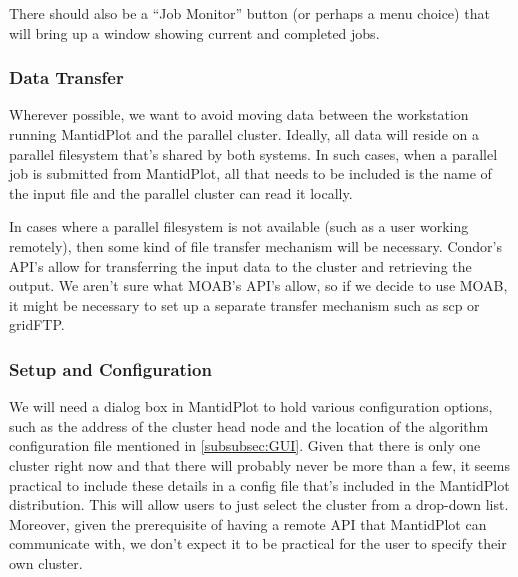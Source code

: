 There should also be a ``Job Monitor'' button (or perhaps a menu choice) that will bring up a window showing current and completed jobs.

\subsubsection{Data Transfer}
Wherever possible, we want to avoid moving data between the workstation running MantidPlot and the parallel cluster.  Ideally, all data will reside on a parallel filesystem that's shared by both systems.  In such cases, when a parallel job is submitted from MantidPlot, all that needs to be included is the name of the input file and the parallel cluster can read it locally.  

In cases where a parallel filesystem is not available (such as a user working remotely), then some kind of file transfer mechanism will be necessary.  Condor's API's allow for transferring the input data to the cluster and retrieving the output.  We aren't sure what MOAB's API's allow, so if we decide to use MOAB, it might be necessary to set up a separate transfer mechanism such as scp or gridFTP.

%
%



\subsubsection{Setup and Configuration}
We will need a dialog box in MantidPlot to hold various configuration options, such as the address of the cluster head node and the location of the algorithm configuration file mentioned in \ref{subsubsec:GUI}.  Given that there is only one cluster right now and that there will probably never be more than a few, it seems practical to include these details in a config file that's included in the MantidPlot distribution.  This will allow users to just select the cluster from a drop-down list.  Moreover, given the prerequisite of having a remote API that MantidPlot can communicate with, we don't expect it to be practical for the user to specify their own cluster.


